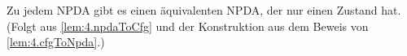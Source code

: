 \begin{Bemerkung}
Zu jedem \ac{NPDA} gibt es einen äquivalenten \ac{NPDA}, der nur einen Zustand hat.
(Folgt aus \autoref{lem:4.npdaToCfg} und der Konstruktion aus dem Beweis von \autoref{lem:4.cfgToNpda}.)
\end{Bemerkung}



